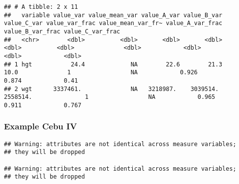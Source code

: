 \documentclass[
]{book}
\newenvironment{Shaded}{\begin{snugshade}}{\end{snugshade}}
\newcommand{\DataTypeTok}[1]{\textcolor[rgb]{0.13,0.29,0.53}{#1}}
\newcommand{\DecValTok}[1]{\textcolor[rgb]{0.00,0.00,0.81}{#1}}
\newcommand{\KeywordTok}[1]{\textcolor[rgb]{0.13,0.29,0.53}{\textbf{#1}}}
\newcommand{\NormalTok}[1]{#1}
\newcommand{\OperatorTok}[1]{\textcolor[rgb]{0.81,0.36,0.00}{\textbf{#1}}}
\newcommand{\OtherTok}[1]{\textcolor[rgb]{0.56,0.35,0.01}{#1}}
\newcommand{\StringTok}[1]{\textcolor[rgb]{0.31,0.60,0.02}{#1}}
\begin{document}
\begin{verbatim}
## # A tibble: 2 x 11
##   variable value_var value_mean_var value_A_var value_B_var value_C_var value_var_frac value_mean_var_fr~ value_A_var_frac value_B_var_frac value_C_var_frac
##   <chr>        <dbl>          <dbl>       <dbl>       <dbl>       <dbl>          <dbl>              <dbl>            <dbl>            <dbl>            <dbl>
## 1 hgt           24.4             NA        22.6        21.3        10.0              1                 NA            0.926            0.874            0.41 
## 2 wgt      3337461.              NA   3218987.    3039514.    2558514.               1                 NA            0.965            0.911            0.767
\end{verbatim}

\hypertarget{example-cebu-iv}{%
\subsubsection{Example Cebu IV}\label{example-cebu-iv}}

\begin{Shaded}
\end{Shaded}

\begin{verbatim}
## Warning: attributes are not identical across measure variables;
## they will be dropped

## Warning: attributes are not identical across measure variables;
## they will be dropped
\end{verbatim}

\begin{Shaded}
\end{Shaded}
\end{document}
